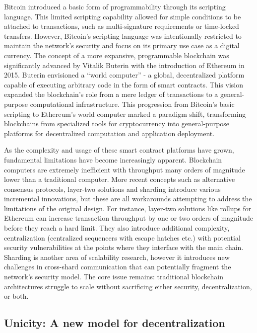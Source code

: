 \documentclass{article}
\begin{document}
Bitcoin introduced a basic form of programmability
through its scripting language. This limited scripting capability allowed for simple conditions
to be attached to transactions, such as multi-signature requirements or time-locked transfers. However,
Bitcoin’s scripting language was intentionally restricted to maintain the network’s security and focus on its
primary use case as a digital currency. The concept of a more expansive, programmable blockchain was significantly advanced by Vitalik Buterin
with the introduction of Ethereum in 2015. Buterin envisioned a “world computer” - a global, decentralized
platform capable of executing arbitrary code in the form of smart contracts. This vision expanded the
blockchain’s role from a mere ledger of transactions to a general-purpose computational infrastructure. This
progression from Bitcoin’s basic scripting to Ethereum’s world computer marked a paradigm shift, transforming
blockchains from specialized tools for cryptocurrency into general-purpose platforms for decentralized
computation and application deployment.



As the complexity and usage of these smart contract platforms have grown, fundamental limitations have become increasingly apparent. Blockchain computers are extremely inefficient with throughput many orders of magnitude lower than a traditional computer. More recent concepts such as alternative consensus protocols, layer-two solutions and sharding introduce various incremental innovations, but these are all workarounds attempting to address the limitations of the original design. For instance, layer-two solutions like rollups for Ethereum can increase transaction throughput by one or two orders of magnitude before they reach a hard limit. They also introduce additional complexity, centralization (centralized sequencers with escape hatches etc.) with potential security vulnerabilities at the points where they interface with the main chain. Sharding is another area of scalability research, however it introduces new challenges in cross-shard communication that can potentially fragment the network's security model. The core issue remains: traditional blockchain architectures struggle to scale without sacrificing either security, decentralization, or both.

\subsection{Unicity: A new model for decentralization}
\end{document}
